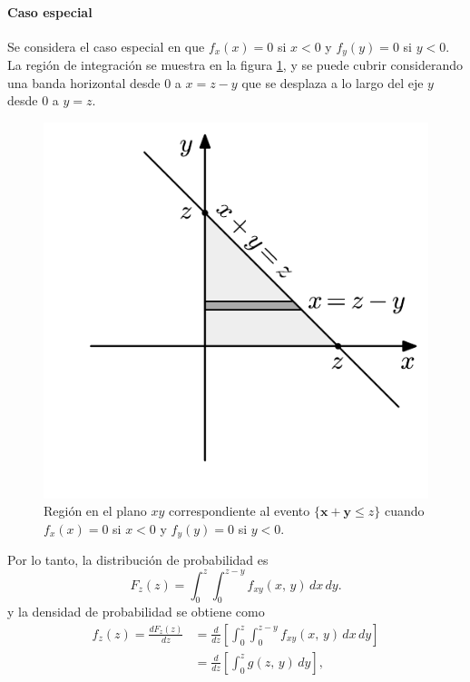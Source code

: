\documentclass[a4paper]{report}
\newcommand{\x}{\mathbf{x}}
\newcommand{\y}{\mathbf{y}}
\begin{document}
\paragraph{Caso especial} Se considera el caso especial en que \(f_x(x)=0\) si \(x<0\) y \(f_y(y)=0\) si \(y<0\). La región de integración se muestra en la figura \ref{fig:joint_distribution_region_rv_sum_positive}, y se puede cubrir considerando una banda horizontal desde 0 a \(x=z-y\) que se desplaza a lo largo del eje \(y\) desde 0 a \(y=z\).
\begin{figure}[!htb]
  \begin{minipage}[c]{0.36\textwidth}
    \includegraphics[width=\textwidth]{figuras/joint_distribution_region_rv_sum_positive.pdf}
  \end{minipage}\hfill
  \begin{minipage}[c]{0.56\textwidth}
    \caption{
       Región en el plano \(xy\) correspondiente al evento \(\{\x+\y\leq z\}\) cuando \(f_x(x)=0\) si \(x<0\) y \(f_y(y)=0\) si \(y<0\).
    } \label{fig:joint_distribution_region_rv_sum_positive}
  \end{minipage}
\end{figure}
Por lo tanto, la distribución de probabilidad es
\[
 F_z(z)=\int_{0}^{z}\int_{0}^{z-y}f_{xy}(x,\,y)\,dx\,dy.
\]
y la densidad de probabilidad se obtiene como
\begin{align*}
 f_z(z)=\frac{dF_z(z)}{dz}&=\frac{d}{dz}\left[\int_{0}^{z}\int_{0}^{z-y}f_{xy}(x,\,y)\,dx\,dy\right]\\
  &=\frac{d}{dz}\left[\int_{0}^{z}g(z,\,y)\,dy\right],
\end{align*}
\end{document}

